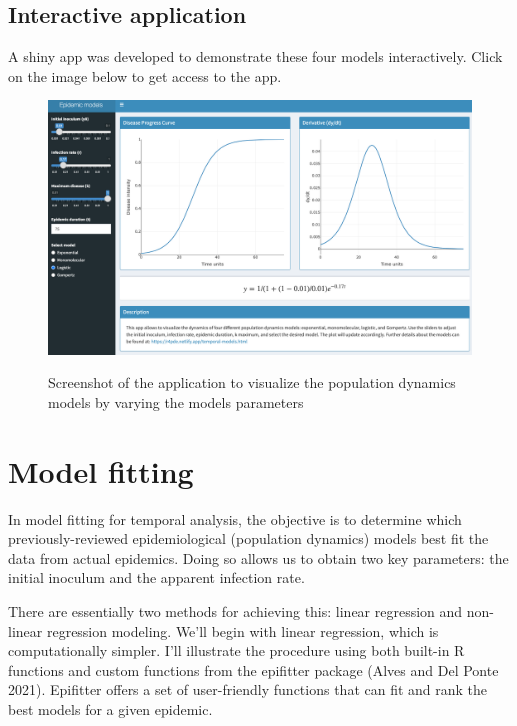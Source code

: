\documentclass[
  letterpaper,
]{book}
\begin{document}
\hypertarget{interactive-application}{%
\section{Interactive application}\label{interactive-application}}

A shiny app was developed to demonstrate these four models
interactively. Click on the image below to get access to the app.

\begin{figure}

{\centering 

\href{https://edelponte.shinyapps.io/epidemics/}{\includegraphics[width=5.55208in,height=\textheight]{imgs/epidemic_models.png}}

}

\caption{\label{fig-models}Screenshot of the application to visualize
the population dynamics models by varying the model\textquotesingle s
parameters}

\end{figure}

\hypertarget{model-fitting}{%
\chapter{Model fitting}\label{model-fitting}}

In model fitting for temporal analysis, the objective is to determine
which previously-reviewed epidemiological (population dynamics) models
best fit the data from actual epidemics. Doing so allows us to obtain
two key parameters: the initial inoculum and the apparent infection
rate.

There are essentially two methods for achieving this: linear regression
and non-linear regression modeling. We'll begin with linear regression,
which is computationally simpler. I'll illustrate the procedure using
both built-in R functions and custom functions from the epifitter
package (Alves and Del Ponte 2021). Epifitter offers a set of
user-friendly functions that can fit and rank the best models for a
given epidemic.
\end{document}
